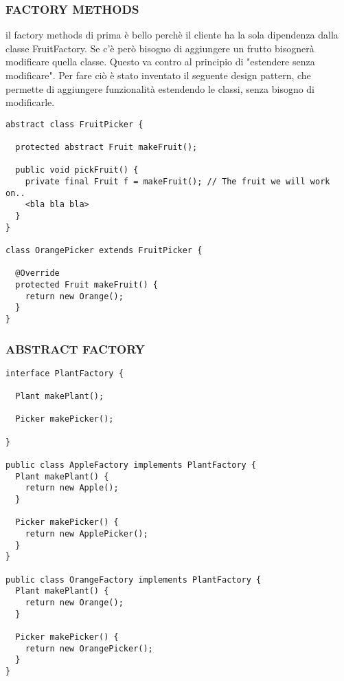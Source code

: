 \subsubsection{FACTORY METHODS}
\noindent il factory  methods di prima è bello perchè il cliente ha la sola dipendenza dalla classe FruitFactory. Se c'è però bisogno di aggiungere un frutto bisognerà modificare quella classe. Questo va contro al principio di "estendere senza modificare". Per fare ciò è stato inventato il seguente design pattern, che permette di aggiungere funzionalità estendendo le classi, senza bisogno di modificarle.
\begin{lstlisting}
abstract class FruitPicker {

  protected abstract Fruit makeFruit();

  public void pickFruit() {
    private final Fruit f = makeFruit(); // The fruit we will work on..
    <bla bla bla>
  }
}

class OrangePicker extends FruitPicker {

  @Override
  protected Fruit makeFruit() {
    return new Orange();
  }
}
\end{lstlisting}
\subsubsection{ABSTRACT FACTORY}
\begin{lstlisting}
interface PlantFactory {

  Plant makePlant();

  Picker makePicker(); 

}

public class AppleFactory implements PlantFactory {
  Plant makePlant() {
    return new Apple();
  }

  Picker makePicker() {
    return new ApplePicker();
  }
}

public class OrangeFactory implements PlantFactory {
  Plant makePlant() {
    return new Orange();
  }

  Picker makePicker() {
    return new OrangePicker();
  }
}
\end{lstlisting}
